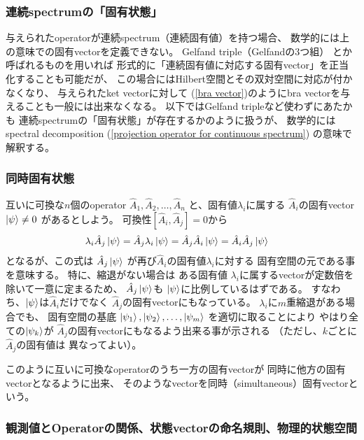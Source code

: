 \subsubsection{連続spectrumの「固有状態」}

与えられたoperatorが連続spectrum（連続固有値）を持つ場合、
数学的には上の意味での固有vectorを定義できない。
Gelfand triple（Gelfandの$3$つ組）
とか呼ばれるものを用いれば
形式的に「連続固有値に対応する固有vector」を正当化することも可能だが、
この場合にはHilbert空間とその双対空間に対応が付かなくなり、
与えられたket vectorに対して
(\ref{bra vector})のようにbra vectorを与えることも一般には出来なくなる。
以下ではGelfand tripleなど使わずにあたかも
連続spectrumの「固有状態」が存在するかのように扱うが、
数学的にはspectral decomposition
(\ref{projection operator for continuous spectrum})
の意味で解釈する。

\subsubsection{同時固有状態}

互いに可換な$n$個のoperator
$\hat{A}_1, \hat{A}_2, \dots, \hat{A}_n$
と、固有値$\lambda_i$に属する
$\hat{A}_i$の固有vector $\ket{\psi} \neq 0$
があるとしよう。
可換性$[\hat{A}_i, \hat{A}_j] = 0$から
\begin{align}
    \lambda_i \hat{A}_j \ket{\psi}
    &=
    \hat{A}_j \lambda_i \ket{\psi}
    =
    \hat{A}_j \hat{A}_i \ket{\psi}
    =
    \hat{A}_i \hat{A}_j \ket{\psi}
\end{align}
となるが、この式は
$\hat{A}_j \ket{\psi}$
が再び$\hat{A}_i$の固有値$\lambda_i$に対する
固有空間の元である事を意味する。
特に、縮退がない場合は
ある固有値
$\lambda_i$に属するvectorが定数倍を除いて一意に定まるため、
$\hat{A}_j \ket{\psi}$も
$\ket{\psi}$に比例しているはずである。
すなわち、$\ket{\psi}$は$\hat{A}_i$だけでなく
$\hat{A}_j$の固有vectorにもなっている。
$\lambda_i$に$m$重縮退がある場合でも、
固有空間の基底
$\ket{\psi_1}, \ket{\psi_2}, \dots, \ket{\psi_m}$
を適切に取ることにより
やはり全ての$\ket{\psi_k}$が
$\hat{A}_j$の固有vectorにもなるよう出来る事が示される
（ただし、$k$ごとに$\hat{A}_j$の固有値は
異なってよい）。

このように互いに可換なoperatorのうち一方の固有vectorが
同時に他方の固有vectorとなるように出来、
そのようなvectorを同時（simultaneous）固有vectorという。

\subsubsection{観測値とOperatorの関係、状態vectorの命名規則、物理的状態空間}

